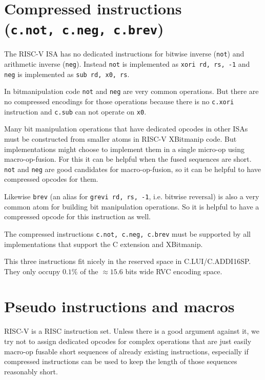 


\section{Compressed instructions (\texttt{c.not,\ c.neg,\ c.brev})}

The RISC-V ISA has no dedicated instructions for bitwise inverse (\texttt{not})
and arithmetic inverse (\texttt{neg}). Instead \texttt{not} is implemented as
\texttt{xori\ rd,\ rs,\ -1} and \texttt{neg} is implemented as
\texttt{sub\ rd,\ x0,\ rs}.

In bitmanipulation code \texttt{not} and \texttt{neg} are very common operations. But
there are no compressed encodings for those operations because there is no \texttt{c.xori}
instruction and \texttt{c.sub} can not operate on \texttt{x0}.

Many bit manipulation operations that have dedicated opcodes in other ISAs
must be constructed from smaller atoms in RISC-V XBitmanip code. But
implementations might choose to implement them in a single micro-op using
macro-op-fusion. For this it can be helpful when the fused sequences are short.
\texttt{not} and \texttt{neg} are good candidates for macro-op-fusion, so
it can be helpful to have compressed opcodes for them.

Likewise \texttt{brev} (an alias for \texttt{grevi\ rd,\ rs,\ -1}, i.e. bitwise
reversal) is also a very common atom for building bit manipulation operations. So it
is helpful to have a compressed opcode for this instruction as well.

The compressed instructions \texttt{c.not,\ c.neg,\ c.brev} must be supported by
all implementations that support the C extension and XBitmanip.



This three instructions fit nicely in the reserved space in C.LUI/C.ADDI16SP.
They only occupy $0.1\%$ of the $\approx15.6$ bits wide RVC encoding space.


\section{Pseudo instructions and macros}

RISC-V is a RISC instruction set. Unless there is a good argument against it, we try not
to assign dedicated opcodes for complex operations that are just easily macro-op fusable
short sequences of already existing instructions, especially if compressed instructions
can be used to keep the length of those sequences reasonably short.


